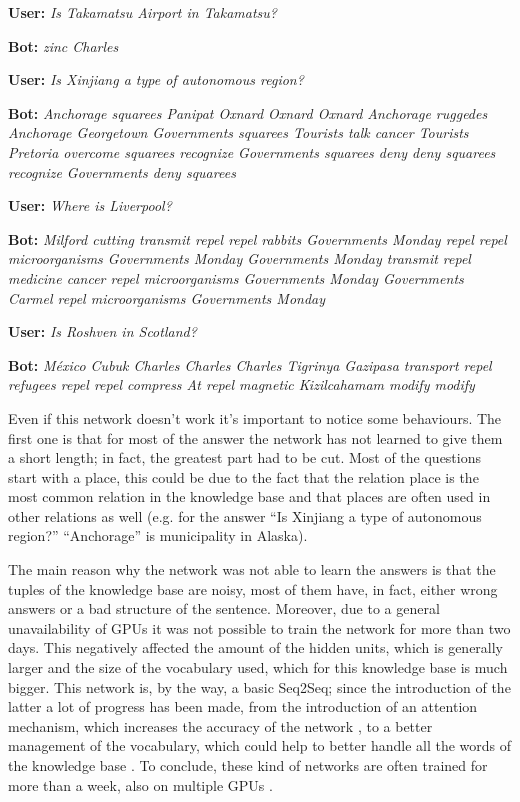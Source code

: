 \documentclass[paper=a4, fontsize=11pt]{scrartcl} %
\numberwithin{equation}{section} %
\numberwithin{figure}{section} %
\numberwithin{table}{section} %
\theoremstyle{definition}
\begin{document}
\textbf{User:} \textit{Is Takamatsu Airport in Takamatsu?}

\textbf{Bot:} \textit{zinc Charles}

\textbf{User:} \textit{Is Xinjiang a type of autonomous region?}

\textbf{Bot:} \textit{Anchorage squarees Panipat Oxnard Oxnard Oxnard Anchorage ruggedes Anchorage Georgetown Governments squarees Tourists talk cancer Tourists Pretoria overcome squarees recognize Governments squarees deny deny squarees recognize Governments deny squarees}

\textbf{User:} \textit{Where is Liverpool?}

\textbf{Bot:} \textit{Milford cutting transmit repel repel rabbits Governments Monday repel repel microorganisms Governments Monday Governments Monday transmit repel medicine cancer repel microorganisms Governments Monday Governments Carmel repel microorganisms Governments Monday}

\textbf{User:} \textit{Is Roshven in Scotland?}

\textbf{Bot:} \textit{M\'{e}xico Cubuk Charles Charles Charles Tigrinya Gazipasa transport repel refugees repel repel compress At repel magnetic Kizilcahamam modify modify}

Even if this network doesn't work it's important to notice some behaviours.
The first one is that for most of the answer the network has not learned to
give them a short length; in fact, the greatest part had to be cut. Most of the
questions start with a place, this could be due to the fact that the relation
place is the most common relation in the knowledge base and that places are
often used in other relations as well (e.g. for the answer ``Is Xinjiang a
type of autonomous region?'' ``Anchorage'' is municipality in Alaska).

The main reason why the network was not able to learn the answers is that the
tuples of the knowledge base are noisy, most of them have, in fact, either wrong
answers or a bad structure of the sentence. Moreover, due to a general
unavailability of GPUs it was not possible to train the network for more than
two days. This negatively affected the amount of the hidden units, which is
generally larger and the size of the vocabulary used, which for this
knowledge base is much bigger. This network is, by the way, a basic Seq2Seq;
since the introduction of the latter a lot of progress has been made,
from the introduction of an attention mechanism, which increases the accuracy of the
network \cite{journals/corr/LuongPM15}, to a better management of the vocabulary, which could help to
better handle all the words of the knowledge base \cite{jean-al-acl2015}. To conclude, these
kind of networks are often trained for more than a week, also on multiple
GPUs \cite{DBLP:journals/corr/WuSCLNMKCGMKSJL16}.
\end{document}
